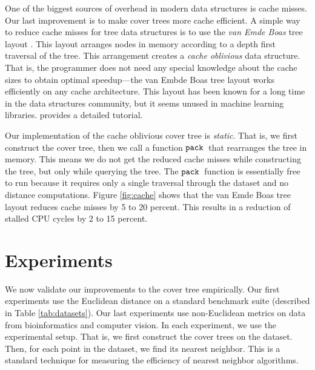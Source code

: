 \documentclass[thesis.tex]{subfiles}
\newcommand{\pack}{\ensuremath{\textnormal{\ttfamily pack}}}
\begin{document}
One of the biggest sources of overhead in modern data structures is cache misses.
Our last improvement is to make cover trees more cache efficient.
A simple way to reduce cache misses for tree data structures is to use the \emph{van Emde Boas} tree layout
\cite{frigo1999}.
This layout arranges nodes in memory according to a depth first traversal of the tree.
This arrangement creates a \emph{cache oblivious} data structure.
That is, the programmer does not need any special knowledge about the cache sizes to obtain optimal speedup---the van Embde Boas tree layout works efficiently on any cache architecture.
This layout has been known for a long time in the data structures community, but it seems unused in machine learning libraries.
\citet{frigo1999} provides a detailed tutorial.

Our implementation of the cache oblivious cover tree is \emph{static}.
That is, we first construct the cover tree, then we call a function \pack~that rearranges the tree in memory.
This means we do not get the reduced cache misses while constructing the tree, but only while querying the tree.
The \pack\ function is essentially free to run because it requires only a single traversal through the dataset and no distance computations.
Figure \ref{fig:cache} shows that the van Emde Boas tree layout reduces cache misses by 5 to 20 percent.
This results in a reduction of stalled CPU cycles by 2 to 15 percent.


\section{Experiments}
\label{sec:experiments}

We now validate our improvements to the cover tree empirically.
Our first experiments use the Euclidean distance on a standard benchmark suite (described in Table \ref{tab:datasets}).
Our last experiments use non-Euclidean metrics on data from bioinformatics and computer vision.
In each experiment, we use the  experimental setup.
That is, we first construct the cover trees on the dataset.
Then, for each point in the dataset, we find its nearest neighbor.
This is a standard technique for measuring the efficiency of nearest neighbor algorithms.
\end{document}
